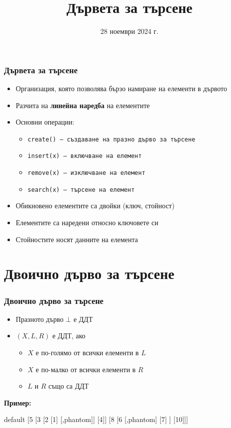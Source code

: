 \documentclass[alsotrans,beameroptions={aspectratio=169}]{beamerswitch}
\title{Дървета за търсене}
\date{28 ноември 2024 г.}
\newcommand{\samplebinordtree}{%
  \begin{forest}
    default [5 [3 [2 [1] [,phantom]] [4]] [8 [6 [,phantom] [7] ] [10]]]
  \end{forest}%
}
\begin{document}
\begin{frame}
  \titlepage
\end{frame}

\begin{frame}
  \frametitle{Дървета за търсене}
  \begin{itemize}
  \item Организация, която позволява бързо намиране на елементи в дървото
  \item Разчита на \textbf{линейна наредба} на елементите
  \item Основни операции:
    \begin{itemize}
    \item \tt{create()} --- създаване на празно дърво за търсене
    \item \tt{insert(x)} --- включване на елемент
    \item \tt{remove(x)} --- изключване на елемент
    \item \tt{search(x)} --- търсене на елемент
    \end{itemize}
  \item Обикновено елементите са двойки (ключ, стойност)
  \item Елементите са наредени относно ключовете си
  \item Стойностите носят данните на елемента
  \end{itemize}
\end{frame}

\section{Двоично дърво за търсене}

\begin{frame}
  \frametitle{Двоично дърво за търсене}
  \begin{definition}
    \begin{itemize}
    \item Празното дърво $\bot$ е ДДТ
    \item $(X,L,R)$ е ДДТ, ако
      \begin{itemize}
      \item $X$ е по-голямо от всички елементи в $L$
      \item $X$ е по-малко от всички елементи в $R$
      \item $L$ и $R$ също са ДДТ
      \end{itemize}
    \end{itemize}
  \end{definition}
  \pause
  \textbf{Пример:}
  \vspace{-2.5ex}
  \begin{center}
    \footnotesize
    \samplebinordtree
  \end{center}
\end{frame}
\end{document}
